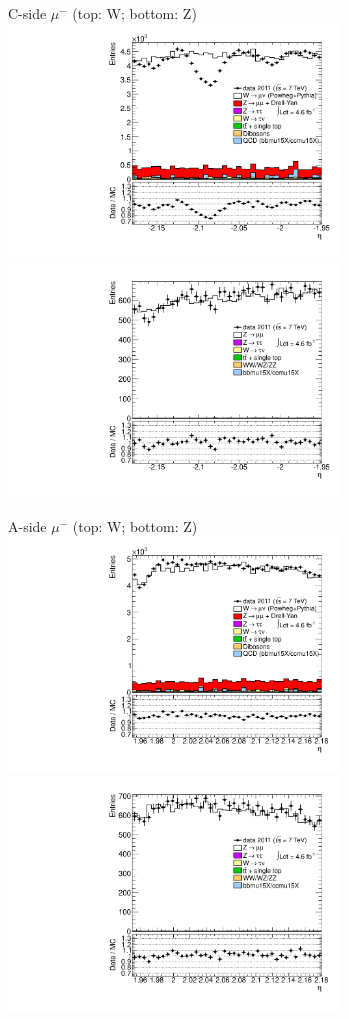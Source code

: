 {{
C-side $\mu^{-}$ (top: W; bottom: Z)
\centering
\includegraphics[width=0.66\textwidth]{dates/20130306/figures/etaphi/Wpt35_10_C_stack_l_eta_NEG} \\
\includegraphics[width=0.66\textwidth]{dates/20130306/figures/etaphi/Zpt35_10_C_stack_lN_eta_ALL.pdf}

A-side $\mu^{-}$ (top: W; bottom: Z)
\centering
\includegraphics[width=0.66\textwidth]{dates/20130306/figures/etaphi/Wpt35_10_A_stack_l_eta_NEG} \\
\includegraphics[width=0.66\textwidth]{dates/20130306/figures/etaphi/Zpt35_10_A_stack_lN_eta_ALL.pdf} 

}}
